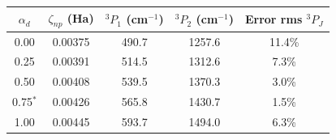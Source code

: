 \begin{tabular}{ccccc}
    \toprule
    $\alpha_d$ & $\zeta_{np}$ (Ha) & $^3P_1$ (cm$^{-1}$) & $^3P_2$ (cm$^{-1}$) & Error rms $^3P_J$ \\
    \midrule
    0.00 & 0.00375 & 490.7 & 1257.6 & 11.4\% \\
    0.25 & 0.00391 & 514.5 & 1312.6 & 7.3\% \\
    0.50 & 0.00408 & 539.5 & 1370.3 & 3.0\% \\
    0.75$^{*}$ & 0.00426 & 565.8 & 1430.7 & 1.5\% \\
    1.00 & 0.00445 & 593.7 & 1494.0 & 6.3\% \\
    \bottomrule
\end{tabular}
